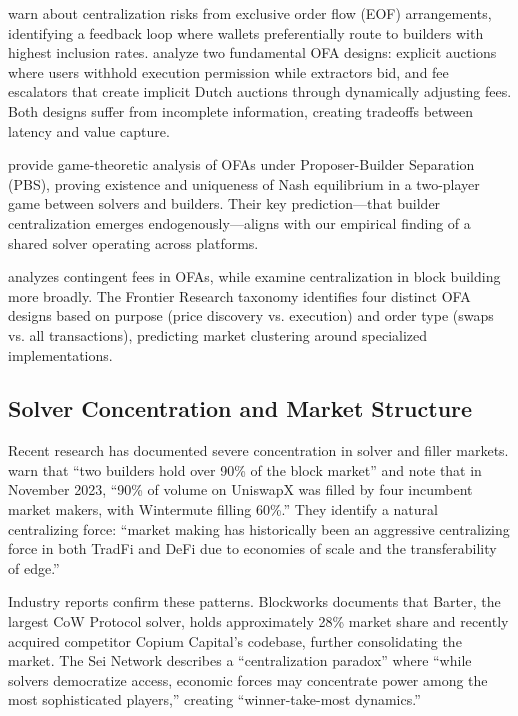 \documentclass[12pt,a4paper]{article}
\begin{document}
\cite{flashbots2023ofa1} warn about centralization risks from exclusive order flow (EOF) arrangements, identifying a feedback loop where wallets preferentially route to builders with highest inclusion rates. \cite{flashbots2023ofa2} analyze two fundamental OFA designs: explicit auctions where users withhold execution permission while extractors bid, and fee escalators that create implicit Dutch auctions through dynamically adjusting fees. Both designs suffer from incomplete information, creating tradeoffs between latency and value capture.

\cite{ma2025} provide game-theoretic analysis of OFAs under Proposer-Builder Separation (PBS), proving existence and uniqueness of Nash equilibrium in a two-player game between solvers and builders. Their key prediction---that builder centralization emerges endogenously---aligns with our empirical finding of a shared solver operating across platforms.

\cite{resnick2023} analyzes contingent fees in OFAs, while \cite{roughgarden2024} examine centralization in block building more broadly. The Frontier Research taxonomy \citep{frontier2024} identifies four distinct OFA designs based on purpose (price discovery vs. execution) and order type (swaps vs. all transactions), predicting market clustering around specialized implementations.

\subsection{Solver Concentration and Market Structure}

Recent research has documented severe concentration in solver and filler markets. \cite{flashbots2023ofa1} warn that ``two builders hold over 90\% of the block market'' and note that in November 2023, ``90\% of volume on UniswapX was filled by four incumbent market makers, with Wintermute filling 60\%.'' They identify a natural centralizing force: ``market making has historically been an aggressive centralizing force in both TradFi and DeFi due to economies of scale and the transferability of edge.''

Industry reports confirm these patterns. Blockworks \citep{blockworks2025} documents that Barter, the largest CoW Protocol solver, holds approximately 28\% market share and recently acquired competitor Copium Capital's codebase, further consolidating the market. The Sei Network \citep{sei2025} describes a ``centralization paradox'' where ``while solvers democratize access, economic forces may concentrate power among the most sophisticated players,'' creating ``winner-take-most dynamics.''
\end{document}
